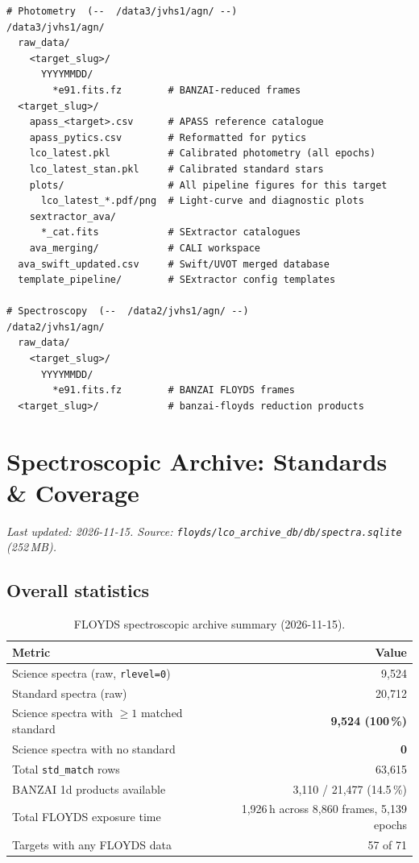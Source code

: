 \documentclass[12pt,a4paper]{article}
\begin{document}
\begin{lstlisting}[style=shell]
# Photometry  (--  /data3/jvhs1/agn/ --)
/data3/jvhs1/agn/
  raw_data/
    <target_slug>/
      YYYYMMDD/
        *e91.fits.fz        # BANZAI-reduced frames
  <target_slug>/
    apass_<target>.csv      # APASS reference catalogue
    apass_pytics.csv        # Reformatted for pytics
    lco_latest.pkl          # Calibrated photometry (all epochs)
    lco_latest_stan.pkl     # Calibrated standard stars
    plots/                  # All pipeline figures for this target
      lco_latest_*.pdf/png  # Light-curve and diagnostic plots
    sextractor_ava/
      *_cat.fits            # SExtractor catalogues
    ava_merging/            # CALI workspace
  ava_swift_updated.csv     # Swift/UVOT merged database
  template_pipeline/        # SExtractor config templates

# Spectroscopy  (--  /data2/jvhs1/agn/ --)
/data2/jvhs1/agn/
  raw_data/
    <target_slug>/
      YYYYMMDD/
        *e91.fits.fz        # BANZAI FLOYDS frames
  <target_slug>/            # banzai-floyds reduction products
\end{lstlisting}


\section{Spectroscopic Archive: Standards \& Coverage}
\label{sec:spec-archive}

\textit{Last updated: 2026-11-15. Source:
\texttt{floyds/lco\_archive\_db/db/spectra.sqlite} (252\,MB).}

\subsection{Overall statistics}

\begin{table}[h!]
\centering
\small
\begin{tabular}{lr}
\toprule
Metric & Value \\
\midrule
Science spectra (raw, \texttt{rlevel=0}) & 9{,}524 \\
Standard spectra (raw) & 20{,}712 \\
Science spectra with $\geq 1$ matched standard & \textbf{9{,}524 (100\,\%)} \\
Science spectra with no standard & \textbf{0} \\
Total \texttt{std\_match} rows & 63{,}615 \\
BANZAI 1d products available & 3{,}110 / 21{,}477 (14.5\,\%) \\
Total FLOYDS exposure time & 1{,}926\,h across 8{,}860 frames, 5{,}139 epochs \\
Targets with any FLOYDS data & 57 of 71 \\
\bottomrule
\end{tabular}
\caption{FLOYDS spectroscopic archive summary (2026-11-15).}
\end{table}
\end{document}
